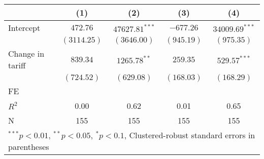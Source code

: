 
\begin{tabular}{l c c c c }
\hline
 & (1) & (2) & (3) & (4) \\
\hline
Intercept & $472.76$    & $47627.81^{***}$ & $-677.26$  & $34009.69^{***}$ \\
            & $(3114.25)$ & $(3646.00)$      & $(945.19)$ & $(975.35)$       \\
Change in tariff     & $839.34$    & $1265.78^{**}$   & $259.35$   & $529.57^{***}$   \\
            & $(724.52)$  & $(629.08)$       & $(168.03)$ & $(168.29)$       \\
\hline
FE          &                &                &                &                \\ 
\hline
$R^2$       & 0.00        & 0.62             & 0.01       & 0.65             \\
N           & 155         & 155              & 155        & 155              \\
\hline
\multicolumn{5}{l}{\scriptsize{$^{***}p<0.01$, $^{**}p<0.05$, $^*p<0.1$, Clustered-robust standard errors in parentheses}}
\end{tabular}
